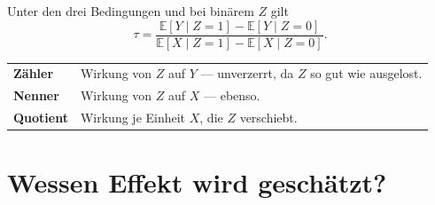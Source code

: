 \begin{merksatz}
Unter den drei Bedingungen und bei binärem $Z$ gilt
\[ \tau = \frac{\mathbb{E}[Y\mid Z=1] - \mathbb{E}[Y\mid Z=0]}{\mathbb{E}[X\mid Z=1] - \mathbb{E}[X\mid Z=0]} . \]

\begin{center}
{\small
\renewcommand{\arraystretch}{1.5}
\begin{tabular}{@{}P{2.6cm}P{6.0cm}@{}}
\toprule
\textbf{Zähler} & Wirkung von $Z$ auf $Y$ --- unverzerrt, da $Z$ so gut wie ausgelost.\\
\textbf{Nenner} & Wirkung von $Z$ auf $X$ --- ebenso.\\
\textbf{Quotient} & Wirkung je Einheit $X$, die $Z$ verschiebt.\\
\bottomrule
\end{tabular}}
\end{center}

\begin{center}
\begin{minipage}{0.88\textwidth}
\end{minipage}
\end{center}
\end{merksatz}

\section{Wessen Effekt wird geschätzt?}

